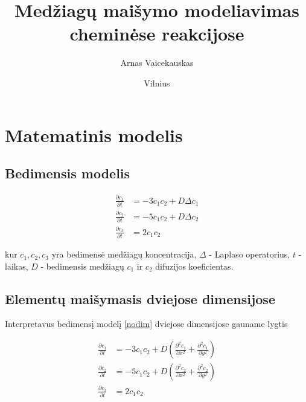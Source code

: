 \documentclass{VUMIFInfKursinis}
\institute{Informatikos institutas}  %
\title{Medžiagų maišymo modeliavimas cheminėse
reakcijose}
\author{Arnas Vaicekauskas}
\date{Vilnius \\ \the\year}
\begin{document}
\maketitle

\tableofcontents





\section{Matematinis modelis}

\subsection{Bedimensis modelis}

\begin{subequations} \label{nodim}
    \begin{align}
    \frac{\partial c_1}{\partial t}&=-3c_1c_2+D\Delta c_1\\
    \frac{\partial c_2}{\partial t}&=-5c_1c_2+D\Delta c_2\\
    \frac{\partial c_3}{\partial t}&=2c_1c_2
    \end{align}
\end{subequations}

kur $c_1,c_2,c_3$ yra bedimensė medžiagų koncentracija, 
$\Delta$ - Laplaso operatorius, $t$ - laikas, 
$D$ - bedimensis medžiagų $c_1$ ir $c_2$ difuzijos koeficientas.

\subsection{Elementų maišymasis dviejose dimensijose}

Interpretavus bedimensį modelį \eqref{nodim} dviejose dimensijose gauname lygtis

\begin{subequations} \label{rect}
    \begin{align}
    \frac{\partial c_1}{\partial t}&=-3c_1c_2+D\left(\frac{\partial^2c_1}{\partial x^2}+\frac{\partial^2c_1}{\partial y^2}\right)\\
    \frac{\partial c_2}{\partial t}&=-5c_1c_2+D\left(\frac{\partial^2c_2}{\partial x^2}+\frac{\partial^2c_2}{\partial y^2}\right)\\
    \frac{\partial c_3}{\partial t}&=2c_1c_2
    \end{align}
\end{subequations}
\end{document}
